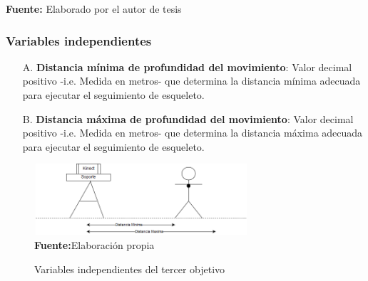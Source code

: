 \begin{table}[H]
\begin{center}
\begin{tabular}{|l|l|l|}
\hline
\end{tabular}
\end{center}
\textbf{Fuente:} Elaborado por el autor de tesis
\end{table}
\subsubsection{Variables independientes} \label{vr:3o:indep}
\begin{enumerate}
	\item[A.] \textbf{Distancia m\'inima de profundidad del movimiento}: Valor decimal positivo -i.e. Medida en metros- que determina la distancia m\'inima adecuada para ejecutar el seguimiento de esqueleto.
	\item[B.] \textbf{Distancia m\'axima de profundidad del movimiento}: Valor decimal positivo -i.e. Medida en metros- que determina la distancia m\'axima adecuada para ejecutar el seguimiento de esqueleto.
\end{enumerate}
\medbreak
\begin{figure}[H]
	\caption{Variables independientes del tercer objetivo}
	\label{fig:varindep3}
	\centering
	\includegraphics[width=300px,height=100px]{graphics/var-3obj-ind.png} \\
	\textbf{Fuente:}Elaboraci\'on propia 
\end{figure}
\medbreak
